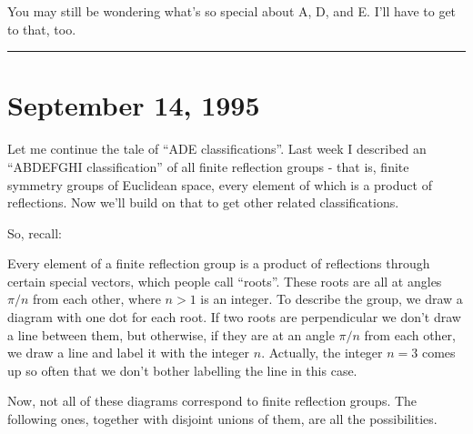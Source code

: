 \documentclass{article}
\begin{document}
You may still be wondering what's so special about A, D, and E. I'll
have to get to that, too.

\begin{center}\rule{0.5\linewidth}{0.5pt}\end{center}
\hypertarget{week63}{%
\section{September 14, 1995}\label{week63}}

Let me continue the tale of ``ADE classifications''. Last week I
described an ``ABDEFGHI classification'' of all finite reflection groups
- that is, finite symmetry groups of Euclidean space, every element of
which is a product of reflections. Now we'll build on that to get other
related classifications.

So, recall:

Every element of a finite reflection group is a product of reflections
through certain special vectors, which people call ``roots''. These
roots are all at angles \(\pi/n\) from each other, where \(n > 1\) is an
integer. To describe the group, we draw a diagram with one dot for each
root. If two roots are perpendicular we don't draw a line between them,
but otherwise, if they are at an angle \(\pi/n\) from each other, we
draw a line and label it with the integer \(n\). Actually, the integer
\(n = 3\) comes up so often that we don't bother labelling the line in
this case.

Now, not all of these diagrams correspond to finite reflection groups.
The following ones, together with disjoint unions of them, are all the
possibilities.
\end{document}
